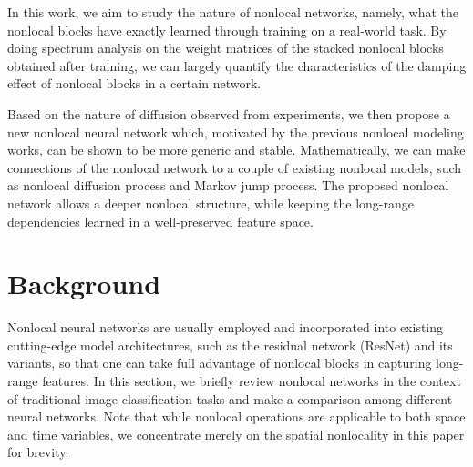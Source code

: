 \documentclass{article}
\begin{document}
In this work, we aim to study the nature of nonlocal networks, namely, what the nonlocal blocks have exactly learned through training on a real-world task. By doing spectrum analysis on the weight matrices of the stacked nonlocal blocks obtained after training, we can largely quantify the characteristics of the damping effect of nonlocal blocks in a certain network.

Based on the nature of diffusion observed from experiments, we then propose a new nonlocal neural network which, motivated by the previous nonlocal modeling works, can be shown to be more generic and stable. Mathematically, we can make connections of the nonlocal network to a couple of existing nonlocal models, such as nonlocal diffusion process and Markov jump process. The proposed nonlocal network allows a deeper nonlocal structure, while keeping the long-range dependencies learned in a well-preserved feature space.




\section{Background}\label{sec:bg}
Nonlocal neural networks are usually employed and incorporated into existing cutting-edge model architectures, such as the residual network (ResNet) and its variants, so that one can take full advantage of nonlocal blocks in capturing long-range features. In this section, we briefly review nonlocal networks in the context of traditional image classification tasks and make a comparison among different neural networks. Note that while nonlocal operations are applicable to both space and time variables, we concentrate merely on the spatial nonlocality in this paper for brevity.
\end{document}
